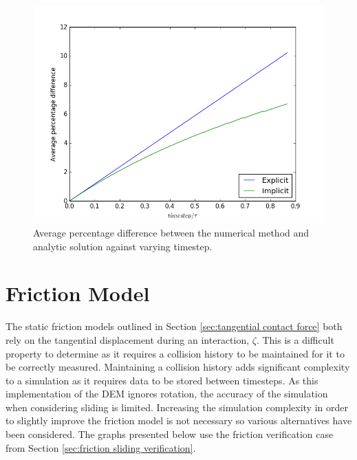 \documentclass[a4paper,11pt,titlepage]{report}
\begin{document}
\begin{figure}[!htb]
\centering
\includegraphics[scale=0.6]{figures/AveragePercentageDifferenceAgainstTimestep.png}
\caption{Average percentage difference between the numerical method and analytic solution against varying timestep.}
\label{fig:avg_percent_diff_against_timestep}
\end{figure}
\section{Friction Model}
\label{sec:friction model}
The static friction models outlined in Section \ref{sec:tangential contact force} both rely on the tangential displacement during an interaction, $\zeta$. This is a difficult property to determine as it requires a collision history to be maintained for it to be correctly measured. Maintaining a collision history adds significant complexity to a simulation as it requires data to be stored between timesteps. As this implementation of the DEM ignores rotation, the accuracy of the simulation when considering sliding is limited. Increasing the simulation complexity in order to slightly improve the friction model is not necessary so various alternatives have been considered. The graphs presented below use the friction verification case from Section \ref{sec:friction sliding verification}.
\end{document}

